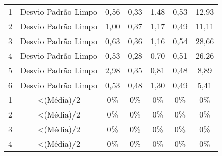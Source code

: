 \begin{table}[]
\begin{tabular}{|c|c|ccccc|}
1                         & Desvio Padrão Limpo                                                        & 0,56                      & 0,33                      & 1,48                      & 0,53                      & 12,93                      \\
2                         & Desvio Padrão Limpo                                                        & 1,00                      & 0,37                      & 1,17                      & 0,49                      & 11,11                      \\
3                         & Desvio Padrão Limpo                                                        & 0,63                      & 0,36                      & 1,16                      & 0,54                      & 28,66                      \\
4                         & Desvio Padrão Limpo                                                        & 0,53                      & 0,28                      & 0,70                      & 0,51                      & 26,26                      \\
5                         & Desvio Padrão Limpo                                                        & 2,98                      & 0,35                      & 0,81                      & 0,48                      & 8,89                       \\
6                         & Desvio Padrão Limpo                                                        & 0,53                      & 0,48                      & 1,30                      & 0,49                      & 5,41                       \\ \hline
1                         & \textless (Média)/2                                                        & 0\%                    & 0\%                    & 0\%                    & 0\%                    & 0\%                     \\
2                         & \textless (Média)/2                                                        & 0\%                    & 0\%                    & 0\%                    & 0\%                    & 0\%                     \\
3                         & \textless (Média)/2                                                        & 0\%                    & 0\%                    & 0\%                    & 0\%                    & 0\%                     \\
4                         & \textless (Média)/2                                                        & 0\%                    & 0\%                    & 0\%                    & 0\%                    & 0\%                     \\

\end{tabular}
\end{table}
